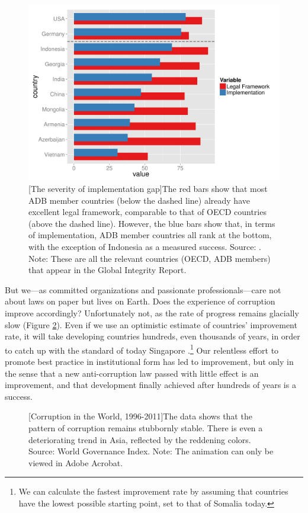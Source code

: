 \documentclass[12pt]{article}
\begin{document}
\begin{figure}
\centering
\includegraphics[scale=0.5]{implementation}
[The severity of implementation gap]{The red bars show that most ADB member countries (below the dashed line) already have excellent legal framework, comparable to that of OECD countries (above the dashed line). However, the blue bars show that, in terms of implementation, ADB member countries all rank at the bottom, with the exception of Indonesia as a measured success. Source: \citet{Integrity2012a}. Note: These are all the relevant countries (OECD, ADB members) that appear in the Global Integrity Report.}
\label{fig:implementation}
\end{figure}

But we---as committed organizations and passionate professionals---care not about laws on paper but lives on Earth. Does the experience of corruption improve accordingly? Unfortunately not, as the rate of progress remains glacially slow (Figure \ref{fig:worldcorruption}). Even if we use an optimistic estimate of countries' improvement rate, it will take developing countries hundreds, even thousands of years, in order to catch up with the standard of today Singapore \citep{Pritchett2010}.\footnote{We can calculate the fastest improvement rate by assuming that countries have the lowest possible starting point, set to that of Somalia today.} Our relentless effort to promote best practice in institutional form has led to improvement, but only in the sense that a new anti-corruption law passed with little effect is an improvement, and that development finally achieved after hundreds of years is a success.

\begin{figure}
\centering
{}
[Corruption in the World, 1996-2011]{The data shows that the pattern of corruption remains stubbornly stable. There is even a deteriorating trend in Asia, reflected by the reddening colors. Source: World Governance Index. Note: The animation can only be viewed in Adobe Acrobat.}
\label{fig:worldcorruption}
\end{figure}
\end{document}
